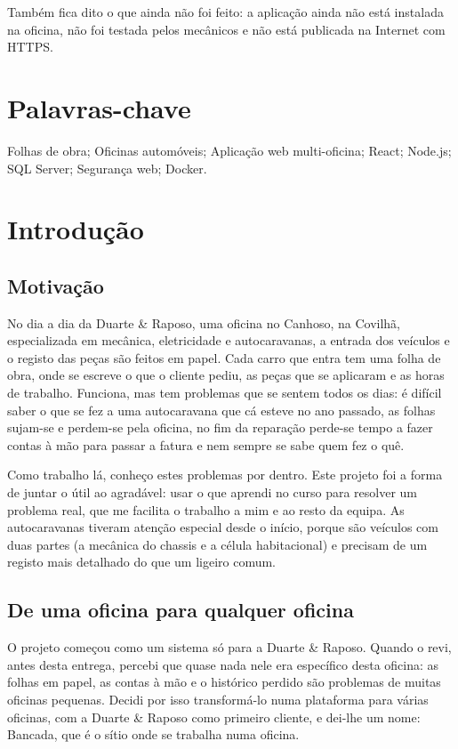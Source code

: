 \documentclass[a4paper,12pt]{article}
\begin{document}
Também fica dito o que ainda não foi feito: a aplicação ainda não está instalada na oficina, não foi testada pelos mecânicos e não está publicada na Internet com HTTPS.

\section*{Palavras-chave}
Folhas de obra; Oficinas automóveis; Aplicação web multi-oficina; React; Node.js; SQL Server; Segurança web; Docker.

\clearpage

\section{Introdução}

\subsection{Motivação}

No dia a dia da Duarte \& Raposo, uma oficina no Canhoso, na Covilhã, especializada em mecânica, eletricidade e autocaravanas, a entrada dos veículos e o registo das peças são feitos em papel. Cada carro que entra tem uma folha de obra, onde se escreve o que o cliente pediu, as peças que se aplicaram e as horas de trabalho. Funciona, mas tem problemas que se sentem todos os dias: é difícil saber o que se fez a uma autocaravana que cá esteve no ano passado, as folhas sujam-se e perdem-se pela oficina, no fim da reparação perde-se tempo a fazer contas à mão para passar a fatura e nem sempre se sabe quem fez o quê.

Como trabalho lá, conheço estes problemas por dentro. Este projeto foi a forma de juntar o útil ao agradável: usar o que aprendi no curso para resolver um problema real, que me facilita o trabalho a mim e ao resto da equipa. As autocaravanas tiveram atenção especial desde o início, porque são veículos com duas partes (a mecânica do chassis e a célula habitacional) e precisam de um registo mais detalhado do que um ligeiro comum.

\subsection{De uma oficina para qualquer oficina}

O projeto começou como um sistema só para a Duarte \& Raposo. Quando o revi, antes desta entrega, percebi que quase nada nele era específico desta oficina: as folhas em papel, as contas à mão e o histórico perdido são problemas de muitas oficinas pequenas. Decidi por isso transformá-lo numa plataforma para várias oficinas, com a Duarte \& Raposo como primeiro cliente, e dei-lhe um nome: Bancada, que é o sítio onde se trabalha numa oficina.
\end{document}
